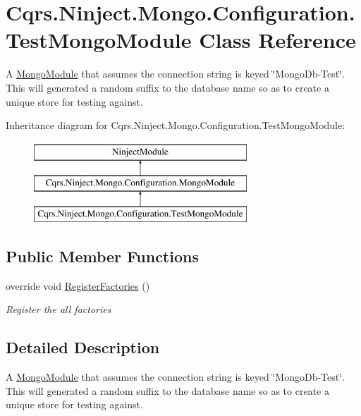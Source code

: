 \hypertarget{classCqrs_1_1Ninject_1_1Mongo_1_1Configuration_1_1TestMongoModule}{}\section{Cqrs.\+Ninject.\+Mongo.\+Configuration.\+Test\+Mongo\+Module Class Reference}
\label{classCqrs_1_1Ninject_1_1Mongo_1_1Configuration_1_1TestMongoModule}


A \hyperlink{classCqrs_1_1Ninject_1_1Mongo_1_1Configuration_1_1MongoModule}{Mongo\+Module} that assumes the connection string is keyed \char`\"{}\+Mongo\+Db-\/\+Test\char`\"{}. This will generated a random suffix to the database name so as to create a unique store for testing against.  


Inheritance diagram for Cqrs.\+Ninject.\+Mongo.\+Configuration.\+Test\+Mongo\+Module\+:\begin{figure}[H]
\begin{center}
\leavevmode
\includegraphics[height=3.000000cm]{classCqrs_1_1Ninject_1_1Mongo_1_1Configuration_1_1TestMongoModule}
\end{center}
\end{figure}
\subsection*{Public Member Functions}
\begin{DoxyCompactItemize}
\item 
override void \hyperlink{classCqrs_1_1Ninject_1_1Mongo_1_1Configuration_1_1TestMongoModule_a8cce844ec177b88a0be2ca8f71b2bc6b}{Register\+Factories} ()
\begin{DoxyCompactList}\small\item\em Register the all factories \end{DoxyCompactList}\end{DoxyCompactItemize}


\subsection{Detailed Description}
A \hyperlink{classCqrs_1_1Ninject_1_1Mongo_1_1Configuration_1_1MongoModule}{Mongo\+Module} that assumes the connection string is keyed \char`\"{}\+Mongo\+Db-\/\+Test\char`\"{}. This will generated a random suffix to the database name so as to create a unique store for testing against. 



